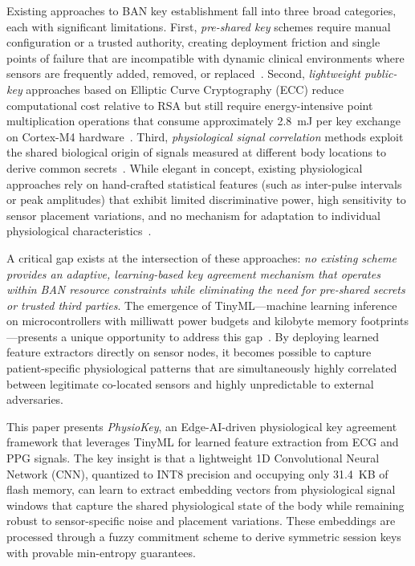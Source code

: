 \documentclass[10pt,twocolumn]{article}
\begin{document}
Existing approaches to BAN key establishment fall into three broad categories, each with significant limitations. First, \textit{pre-shared key} schemes require manual configuration or a trusted authority, creating deployment friction and single points of failure that are incompatible with dynamic clinical environments where sensors are frequently added, removed, or replaced~\cite{eschenauer2002random}. Second, \textit{lightweight public-key} approaches based on Elliptic Curve Cryptography (ECC) reduce computational cost relative to RSA but still require energy-intensive point multiplication operations that consume approximately 2.8~mJ per key exchange on Cortex-M4 hardware~\cite{liu2008establishing}. Third, \textit{physiological signal correlation} methods exploit the shared biological origin of signals measured at different body locations to derive common secrets~\cite{poon2006novel, venkatasubramanian2010pska, rostami2013heart}. While elegant in concept, existing physiological approaches rely on hand-crafted statistical features (such as inter-pulse intervals or peak amplitudes) that exhibit limited discriminative power, high sensitivity to sensor placement variations, and no mechanism for adaptation to individual physiological characteristics~\cite{xu2017walkie}.

A critical gap exists at the intersection of these approaches: \textit{no existing scheme provides an adaptive, learning-based key agreement mechanism that operates within BAN resource constraints while eliminating the need for pre-shared secrets or trusted third parties}. The emergence of TinyML---machine learning inference on microcontrollers with milliwatt power budgets and kilobyte memory footprints---presents a unique opportunity to address this gap~\cite{banbury2021mlperf, warden2019tinyml}. By deploying learned feature extractors directly on sensor nodes, it becomes possible to capture patient-specific physiological patterns that are simultaneously highly correlated between legitimate co-located sensors and highly unpredictable to external adversaries.

This paper presents \textit{PhysioKey}, an Edge-AI-driven physiological key agreement framework that leverages TinyML for learned feature extraction from ECG and PPG signals. The key insight is that a lightweight 1D Convolutional Neural Network (CNN), quantized to INT8 precision and occupying only 31.4~KB of flash memory, can learn to extract embedding vectors from physiological signal windows that capture the shared physiological state of the body while remaining robust to sensor-specific noise and placement variations. These embeddings are processed through a fuzzy commitment scheme to derive symmetric session keys with provable min-entropy guarantees.
\end{document}
